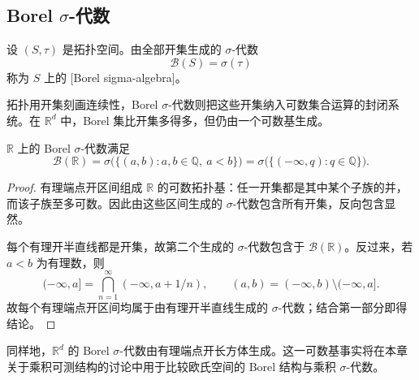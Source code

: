 \subsection{Borel \texorpdfstring{\(\sigma\)}{σ}-代数}
\label{b1:subsec:010204}

\begin{definition}
\label{b1:def:borel-sigma}
设 \((S,\tau)\) 是拓扑空间。由全部开集生成的 \(\sigma\)-代数
\[
\mathcal B(S)=\sigma(\tau)
\]
称为 \(S\) 上的 [Borel sigma-algebra]。
\end{definition}

拓扑用开集刻画连续性，Borel \(\sigma\)-代数则把这些开集纳入可数集合运算的封闭系统。在 \(\mathbb R^d\) 中，Borel 集比开集多得多，但仍由一个可数基生成。

\begin{theorem}
\label{b1:thm:borel-rational-base}
\(\mathbb R\) 上的 Borel \(\sigma\)-代数满足
\[
\mathcal B(\mathbb R)
=\sigma\bigl(\{(a,b):a,b\in\mathbb Q,\ a<b\}\bigr)
=\sigma\bigl(\{(-\infty,q):q\in\mathbb Q\}\bigr).
\]
\end{theorem}
\begin{proof}
有理端点开区间组成 \(\mathbb R\) 的可数拓扑基：任一开集都是其中某个子族的并，而该子族至多可数。因此由这些区间生成的 \(\sigma\)-代数包含所有开集，反向包含显然。

每个有理开半直线都是开集，故第二个生成的 \(\sigma\)-代数包含于 \(\mathcal B(\mathbb R)\)。反过来，若 \(a<b\) 为有理数，则
\[
(-\infty,a]
=\bigcap_{n=1}^{\infty}(-\infty,a+1/n),
\qquad
(a,b)=(-\infty,b)\setminus(-\infty,a].
\]
故每个有理端点开区间均属于由有理开半直线生成的 \(\sigma\)-代数；结合第一部分即得结论。
\end{proof}

\begin{remark}
\label{b1:rem:borel-rd}
同样地，\(\mathbb R^d\) 的 Borel \(\sigma\)-代数由有理端点开长方体生成。这一可数基事实将在本章关于乘积可测结构的讨论中用于比较欧氏空间的 Borel 结构与乘积 \(\sigma\)-代数。
\end{remark}
